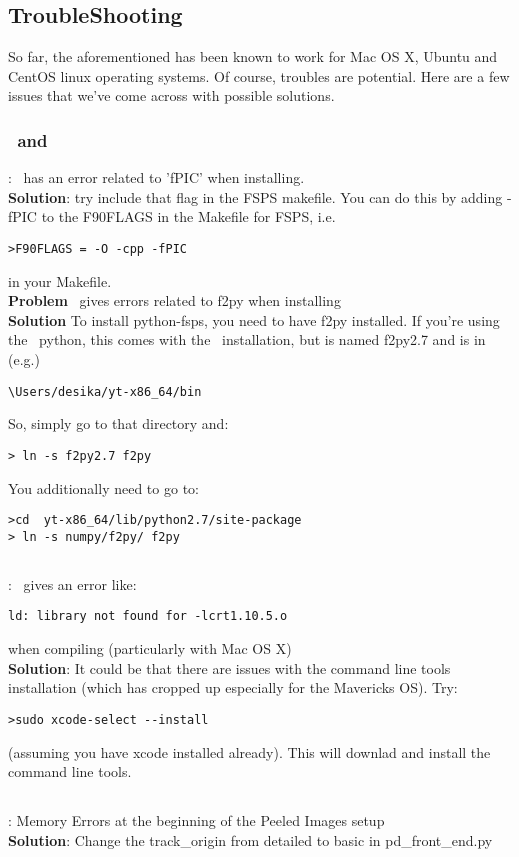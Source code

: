\subsection{TroubleShooting}

So far, the aforementioned has been known to work for Mac OS X, Ubuntu
and CentOS linux operating systems. Of course, troubles are potential.
Here are a few issues that we've come across with possible solutions.

\subsubsection{\fsps \ and \fsps}

\color{red}{\bf Problem}: \color{black} \pfsps \ has an error related to 'fPIC' when installing.\\
\color{blue} {\bf Solution}: \color{black} try include that flag in the FSPS makefile. You can do this by adding -fPIC to the F90FLAGS in the Makefile for FSPS, i.e.
\begin{verbatim}
>F90FLAGS = -O -cpp -fPIC
\end{verbatim}
in your Makefile.\\
\newline
\color{red} {\bf Problem} \color{black} \pfsps \ gives errors related to f2py when installing \\
\color{blue} {\bf Solution} \color{black} To install python-fsps, you
need to have f2py installed. If you're using the \yt \ python, this comes with the \yt \ installation, but
is named f2py2.7 and is in (e.g.)
\begin{verbatim}
\Users/desika/yt-x86_64/bin
\end{verbatim}
So, simply go to that directory and:
\begin{verbatim}
> ln -s f2py2.7 f2py
\end{verbatim}
You additionally need to go to: 
\begin{verbatim}
>cd  yt-x86_64/lib/python2.7/site-package
> ln -s numpy/f2py/ f2py
\end{verbatim}


\subsection{\hyperion}

\color{red}{\bf Problem}: \color{black} \hyperion \ gives an error like:
\begin{verbatim}
ld: library not found for -lcrt1.10.5.o
\end{verbatim}
when compiling (particularly with Mac OS X)\\
\color{blue} {\bf Solution}: \color{black} It could be that there are issues with the command line tools installation (which has cropped up especially for the Mavericks OS).  Try:
\begin{verbatim}
>sudo xcode-select --install
\end{verbatim}
(assuming you have xcode installed already).  This will downlad and
install the command line tools.

\subsection{\pd}
\color{red}{\bf Problem}: \color{black} Memory Errors at the beginning of the Peeled Images setup\\
\color{blue} {\bf Solution}: \color{black} Change the track\_origin from detailed to basic in pd\_front\_end.py

